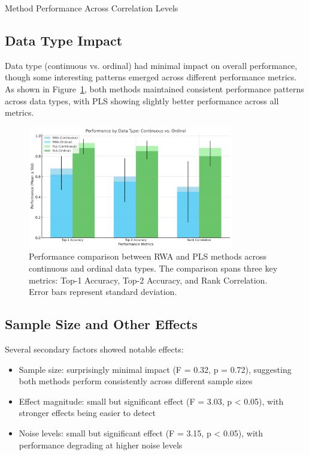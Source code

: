 \begin{table}[htbp]
\centering
\caption{Method Performance Across Correlation Levels}
\label{tab:correlation_summary}

\end{table}

\subsection{Data Type Impact}
Data type (continuous vs. ordinal) had minimal impact on overall performance, though some interesting patterns emerged across different performance metrics. As shown in Figure~\ref{fig:performance_comparison}, both methods maintained consistent performance patterns across data types, with PLS showing slightly better performance across all metrics.

\begin{figure}[htbp]
    \centering
    \includegraphics[width=0.8\textwidth]{figures/performance_comparison.png}
    \caption{Performance comparison between RWA and PLS methods across continuous and ordinal data types. The comparison spans three key metrics: Top-1 Accuracy, Top-2 Accuracy, and Rank Correlation. Error bars represent standard deviation.}
    \label{fig:performance_comparison}
\end{figure}

\subsection{Sample Size and Other Effects}
Several secondary factors showed notable effects:
\begin{itemize}
    \item Sample size: surprisingly minimal impact (F = 0.32, p = 0.72), suggesting both methods perform consistently across different sample sizes
    \item Effect magnitude: small but significant effect (F = 3.03, p < 0.05), with stronger effects being easier to detect
    \item Noise levels: small but significant effect (F = 3.15, p < 0.05), with performance degrading at higher noise levels
\end{itemize}

